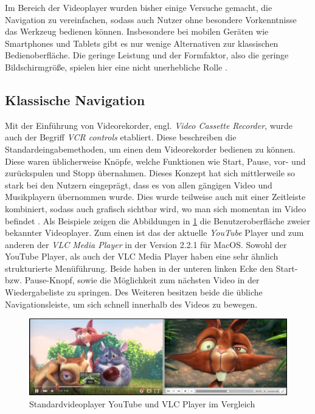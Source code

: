 \documentclass[11pt,a4paper]{report}
\begin{document}
Im Bereich der Videoplayer wurden bisher einige Versuche gemacht, die Navigation zu vereinfachen, sodass auch Nutzer ohne besondere Vorkenntnisse das Werkzeug bedienen können. Insbesondere bei mobilen Geräten wie Smartphones und Tablets gibt es nur wenige Alternativen zur klassischen Bedienoberfläche. Die geringe Leistung und der Formfaktor, also die geringe Bildschirmgröße, spielen hier eine nicht unerhebliche Rolle \cite{fan2003visual}.

\subsection{Klassische Navigation}

Mit der Einführung von Videorekorder, engl.  \textit{Video Cassette Recorder}, wurde auch der Begriff \textit{VCR controls} etabliert. Diese beschreiben die Standardeingabemethoden, um einen dem Videorekorder bedienen zu können. Diese waren üblicherweise Knöpfe, welche Funktionen wie Start, Pause, vor- und zurückspulen und Stopp übernahmen. Dieses Konzept hat sich mittlerweile so stark bei den Nutzern eingeprägt, dass es von allen gängigen Video und Musikplayern übernommen wurde. Dies wurde teilweise auch mit einer Zeitleiste kombiniert, sodass auch grafisch sichtbar wird, wo man sich momentan im Video befindet \cite{he2007supporting}. Als Beispiele zeigen die Abbildungen in \ref{youtube_vlc} die Benutzeroberfläche zweier bekannter Videoplayer. Zum einen ist das der aktuelle \emph{YouTube} Player und zum anderen der \emph{VLC Media Player} in der Version 2.2.1 für MacOS. Sowohl der YouTube Player, als auch der VLC Media Player haben eine sehr ähnlich strukturierte Menüführung. Beide haben in der unteren linken Ecke den Start- bzw. Pause-Knopf, sowie die Möglichkeit zum nächsten Video in der Wiedergabeliste zu springen. Des Weiteren besitzen beide die übliche Navigationsleiste, um sich schnell innerhalb des Videos zu bewegen.
\begin{figure}[h]
\begin{center}
\includegraphics[scale=0.9]{./images/5.png}
\caption{Standardvideoplayer YouTube und VLC Player im Vergleich}
\label{youtube_vlc}
\end{center}
\end{figure}
\end{document}
